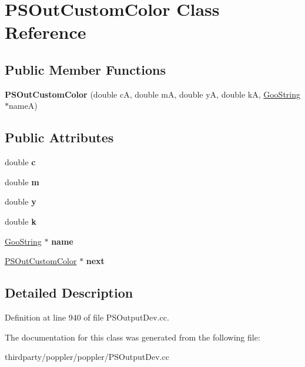 \hypertarget{class_p_s_out_custom_color}{}\section{P\+S\+Out\+Custom\+Color Class Reference}
\label{class_p_s_out_custom_color}
\subsection*{Public Member Functions}
\begin{DoxyCompactItemize}
\item 
\mbox{\label{class_p_s_out_custom_color_a13f222bb30891cd7ace27f2c6827b818}} 
{\bfseries P\+S\+Out\+Custom\+Color} (double cA, double mA, double yA, double kA, \hyperlink{class_goo_string}{Goo\+String} $\ast$nameA)
\end{DoxyCompactItemize}
\subsection*{Public Attributes}
\begin{DoxyCompactItemize}
\item 
\mbox{\label{class_p_s_out_custom_color_a25efd6561a7e37e969e9680af4397ea2}} 
double {\bfseries c}
\item 
\mbox{\label{class_p_s_out_custom_color_a6ee63c59083a25708d3f8886d61a23cd}} 
double {\bfseries m}
\item 
\mbox{\label{class_p_s_out_custom_color_a8bebb634ee8e45ab90717a62060fb14b}} 
double {\bfseries y}
\item 
\mbox{\label{class_p_s_out_custom_color_a633b8953352819706e0294bd1946f7aa}} 
double {\bfseries k}
\item 
\mbox{\label{class_p_s_out_custom_color_ac213d763b4890ec77118435c9626838a}} 
\hyperlink{class_goo_string}{Goo\+String} $\ast$ {\bfseries name}
\item 
\mbox{\label{class_p_s_out_custom_color_af01e76bbb2d38e7c8afb2a5bf69b6cf7}} 
\hyperlink{class_p_s_out_custom_color}{P\+S\+Out\+Custom\+Color} $\ast$ {\bfseries next}
\end{DoxyCompactItemize}


\subsection{Detailed Description}


Definition at line 940 of file P\+S\+Output\+Dev.\+cc.



The documentation for this class was generated from the following file\+:\begin{DoxyCompactItemize}
\item 
thirdparty/poppler/poppler/P\+S\+Output\+Dev.\+cc\end{DoxyCompactItemize}
